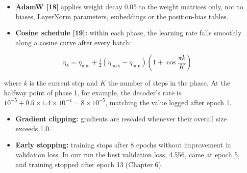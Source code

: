 \begin{itemize}
\tightlist
\item
  \textbf{AdamW {[}18{]}} applies weight decay 0.05 to the weight matrices only, not to biases, LayerNorm parameters, embeddings or the position-bias tables.
\item
  \textbf{Cosine schedule {[}19{]}:} within each phase, the learning rate falls smoothly along a cosine curve after every batch:
\end{itemize}

\[\eta_k = \eta_{\min} + \tfrac{1}{2}\left(\eta_{\max} - \eta_{\min}\right)\left(1 + \cos\frac{\pi k}{K}\right) \tag{3.24}\]

where \(k\) is the current step and \(K\) the number of steps in the phase. At the halfway point of phase 1, for example, the decoder's rate is \(10^{-5} + 0.5 \times 1.4 \times 10^{-4} = 8 \times 10^{-5}\), matching the value logged after epoch 1.

\begin{itemize}
\tightlist
\item
  \textbf{Gradient clipping:} gradients are rescaled whenever their overall size exceeds 1.0.
\item
  \textbf{Early stopping:} training stops after 8 epochs without improvement in validation loss. In our run the best validation loss, 4.556, came at epoch 5, and training stopped after epoch 13 (Chapter 6).
\end{itemize}


